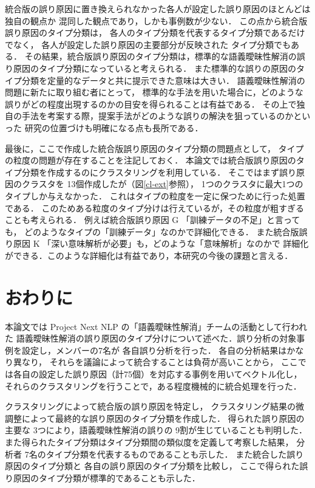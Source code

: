 \documentclass[japanese]{jnlp_1.4}
\begin{document}
統合版の誤り原因に置き換えられなかった各人が設定した誤り原因のほとんどは独自の観点か
混同した観点であり，しかも事例数が少ない．
この点から統合版誤り原因のタイプ分類は，
各人のタイプ分類を代表するタイプ分類であるだけでなく，
各人が設定した誤り原因の主要部分が反映された
タイプ分類でもある．
その結果，統合版誤り原因のタイプ分類は，標準的な語義曖昧性解消の誤り原因のタイプ分類になっていると考えられる．
また標準的な誤りの原因のタイプ分類を定量的なデータと共に提示できた意味は大きい．
語義曖昧性解消の問題に新たに取り組む者にとって，
標準的な手法を用いた場合に，どのような誤りがどの程度出現するのかの目安を得られることは有益である．
その上で独自の手法を考案する際，提案手法がどのような誤りの解決を狙っているのかといった
研究の位置づけも明確になる点も長所である．

最後に，ここで作成した統合版誤り原因のタイプ分類の問題点として，
タイプの粒度の問題が存在することを注記しておく．
本論文では統合版誤り原因のタイプ分類を作成するのにクラスタリングを利用している．
そこではまず誤り原因のクラスタを 13個作成したが（\mbox{図\ref{cl-ext}}参照），
1つのクラスタに最大1つのタイプしか与えなかった．
これはタイプの粒度を一定に保つために行った処置である．
このためある粒度のタイプ分けは行えているが，その粒度が粗すぎることも考えられる．
例えば統合版誤り原因 G 「訓練データの不足」と言っても，
どのようなタイプの「訓練データ」なのかで詳細化できる．
また統合版誤り原因 K 「深い意味解析が必要」も，どのような「意味解析」なのかで
詳細化ができる．このような詳細化は有益であり，本研究の今後の課題と言える．


\section{おわりに}

本論文では Project Next NLP の「語義曖昧性解消」チームの活動として行われた
語義曖昧性解消の誤り原因のタイプ分けについて述べた．誤り分析の対象事例を設定し，メンバーの7名が
各自誤り分析を行った．
各自の分析結果はかなり異なり，
それらを議論によって統合することは負荷が高いことから，
ここでは各自の設定した誤り原因（計75個）を対応する事例を用いてベクトル化し，
それらのクラスタリングを行うことで，ある程度機械的に統合処理を行った．

クラスタリングによって統合版の誤り原因を特定し，
クラスタリング結果の微調整によって最終的な誤り原因のタイプ{分類を作成した}．
得られた誤り原因の主要な 3つにより，語義曖昧性解消の誤りの 9割が生じていることも判明した．
また得られたタイプ分類はタイプ分類間の類似度を定義して考察した結果，
分析者 7名のタイプ分類を代表するものであることも示した．
また統合した誤り原因のタイプ分類と
各自の誤り原因のタイプ分類を比較し，
ここで得られた誤り原因のタイプ分類が標準的であることも示した．
\end{document}
